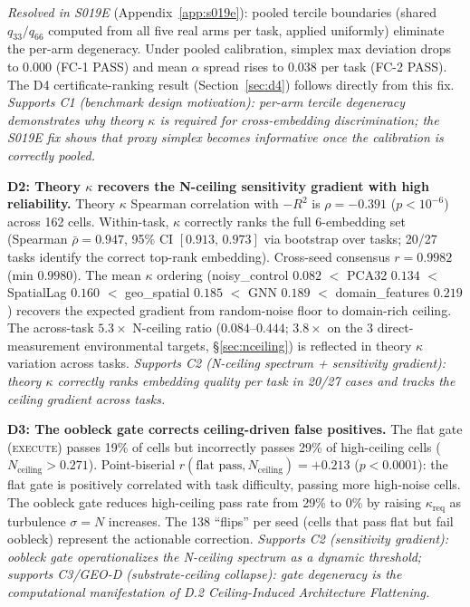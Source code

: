 \documentclass{article}
\begin{document}
\emph{Resolved in S019E} (Appendix~\ref{app:s019e}): pooled tercile boundaries (shared $q_{33}/q_{66}$ computed from all five real arms per task, applied uniformly) eliminate the per-arm degeneracy. Under pooled calibration, simplex max deviation drops to $0.000$ (FC-1 PASS) and mean $\alpha$ spread rises to $0.038$ per task (FC-2 PASS). The D4 certificate-ranking result (Section~\ref{sec:d4}) follows directly from this fix. \emph{Supports C1 (benchmark design motivation): per-arm tercile degeneracy demonstrates why theory $\kappa$ is required for cross-embedding discrimination; the S019E fix shows that proxy simplex becomes informative once the calibration is correctly pooled.}

\textbf{D2: Theory $\kappa$ recovers the N-ceiling sensitivity gradient with high reliability.}
Theory $\kappa$ Spearman correlation with $-R^2$ is $\rho = -0.391$ ($p < 10^{-6}$) across 162 cells. Within-task, $\kappa$ correctly ranks the full 6-embedding set (Spearman $\bar\rho = 0.947$, 95\% CI $[0.913,\, 0.973]$ via bootstrap over tasks; 20/27 tasks identify the correct top-rank embedding). Cross-seed consensus $r = 0.9982$ (min $0.9980$). The mean $\kappa$ ordering (noisy\_control $0.082$ $<$ PCA32 $0.134$ $<$ SpatialLag $0.160$ $<$ geo\_spatial $0.185$ $<$ GNN $0.189$ $<$ domain\_features $0.219$) recovers the expected gradient from random-noise floor to domain-rich ceiling. The across-task $5.3{\times}$ N-ceiling ratio ($0.084$--$0.444$; $3.8{\times}$ on the 3 direct-measurement environmental targets, \S\ref{sec:nceiling}) is reflected in theory $\kappa$ variation across tasks. \emph{Supports C2 (N-ceiling spectrum + sensitivity gradient): theory $\kappa$ correctly ranks embedding quality per task in 20/27 cases and tracks the ceiling gradient across tasks.}

\textbf{D3: The oobleck gate corrects ceiling-driven false positives.}
The flat gate (\textsc{execute}) passes 19\% of cells but incorrectly passes 29\% of high-ceiling cells ($N_{\text{ceiling}} > 0.271$). Point-biserial $r(\text{flat pass}, N_{\text{ceiling}}) = +0.213$ ($p < 0.0001$): the flat gate is positively correlated with task difficulty, passing more high-noise cells. The oobleck gate reduces high-ceiling pass rate from 29\% to 0\% by raising $\kappa_{\text{req}}$ as turbulence $\sigma = N$ increases. The 138 ``flips'' per seed (cells that pass flat but fail oobleck) represent the actionable correction. \emph{Supports C2 (sensitivity gradient): oobleck gate operationalizes the N-ceiling spectrum as a dynamic threshold; supports C3/GEO-D (substrate-ceiling collapse): gate degeneracy is the computational manifestation of D.2 Ceiling-Induced Architecture Flattening.}
\end{document}
